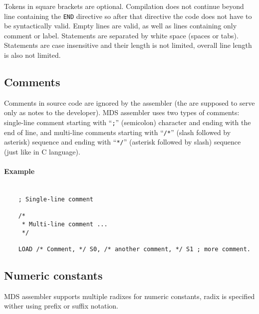         Tokens in square brackets are optional. Compilation does not continue beyond line containing the \texttt{END} directive so after that directive the code does not have to be syntactically valid. Empty lines are valid, as well as lines containing only comment or label. Statements are separated by white space (spaces or tabs). Statements are case insensitive and their length is not limited, overall line length is also not limited.

    \subsection{Comments}
        Comments in source code are ignored by the assembler (the are supposed to serve only as notes to the developer). MDS assembler uses two types of comments: single-line comment starting with ``\texttt{;}'' (semicolon) character and ending with the end of line, and multi-line comments starting with ``\texttt{/*}'' (slash followed by asterisk) sequence and ending with ``\texttt{*/}'' (asterisk followed by slash) sequence (just like in C language).

        \paragraph{Example}
            ~\\
            \verb'    ; Single-line comment'\\
            \verb'    '\\
            \verb'    /*'\\
            \verb'     * Multi-line comment ...'\\
            \verb'     */'\\
            \verb'    '\\
            \verb'    LOAD /* Comment, */ S0, /* another comment, */ S1 ; more comment.'

    \clearpage
    \subsection{Numeric constants}
        MDS assembler supports multiple radixes for numeric constants, radix is specified wither using prefix or suffix notation.

